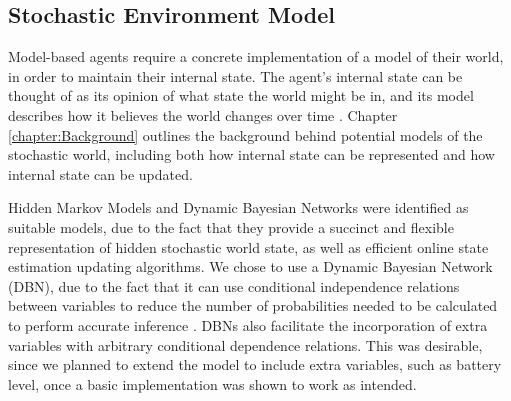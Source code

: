 

\subsection{Stochastic Environment Model}\label{subsec:stochasticEnvModel}
Model-based agents require a concrete implementation of a model of their world, in order to maintain their internal state. The agent's internal state can be thought of as its opinion of what state the world might be in, and its model describes how it believes the world changes over time \cite{AIAMA}. Chapter \ref{chapter:Background} outlines the background behind potential models of the stochastic world, including both how internal state can be represented and how internal state can be updated.\par
Hidden Markov Models and Dynamic Bayesian Networks were identified as suitable models, due to the fact that they provide a succinct and flexible representation of hidden stochastic world state, as well as efficient online state estimation updating algorithms. We chose to use a Dynamic Bayesian Network (DBN), due to the fact that it can use conditional independence relations between variables to reduce the number of probabilities needed to be calculated to perform accurate inference \cite[p.~63]{KollerPGM}. DBNs also facilitate the incorporation of extra variables with arbitrary conditional dependence relations. This was desirable, since we planned to extend the model to include extra variables, such as battery level, once a basic implementation was shown to work as intended.

